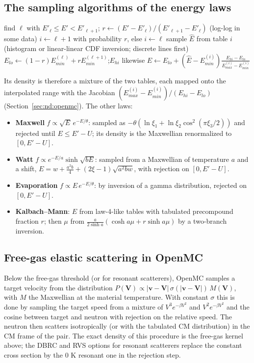 \subsection{The sampling algorithms of the energy laws}

\begin{algorithm}[h]
\caption{Continuous tabular energy law (ENDF law 4 / ACE law 4), as in OpenMC}\label{alg:law4}
\DontPrintSemicolon
find $\ell$ with $E'_\ell\le E'<E'_{\ell+1}$; $r\gets(E'-E'_\ell)/(E'_{\ell+1}-E'_\ell)$ (log-log in some data)\;
$i\gets\ell+1$ with probability $r$, else $i\gets\ell$ 
sample $\hat E$ from table $i$ (histogram or linear-linear CDF inversion; discrete lines first)\;
$E_{lo}\gets(1-r)E^{(\ell)}_{min}+rE^{(\ell+1)}_{min}$;\quad $E_{hi}$ likewise\;
$E\gets E_{lo}+(\hat E-E^{(i)}_{min})\frac{E_{hi}-E_{lo}}{E^{(i)}_{max}-E^{(i)}_{min}}$
\end{algorithm}

Its density is therefore a mixture of the two tables, each mapped onto the interpolated range with the
Jacobian $(E^{(i)}_{max}-E^{(i)}_{min})/(E_{hi}-E_{lo})$ (Section~\ref{sec:nd:openmc}). The other laws:
\begin{itemize}
\item \textbf{Maxwell} $f\propto\sqrt E\,e^{-E/\theta}$: sampled as $-\theta(\ln\xi_1+\ln\xi_2\cos^2(\pi\xi_3/2))$
  and rejected until $E\le E'-U$; its density is the Maxwellian renormalized to $[0,E'-U]$.
\item \textbf{Watt} $f\propto e^{-E/a}\sinh\sqrt{bE}$: sampled from a Maxwellian of temperature $a$ and a
  shift, $E=w+\frac{a^2b}{4}+(2\xi-1)\sqrt{a^2bw}$, with rejection on $[0,E'-U]$.
\item \textbf{Evaporation} $f\propto E\,e^{-E/\theta}$: by inversion of a gamma distribution, rejected on
  $[0,E'-U]$.
\item \textbf{Kalbach--Mann}: $E$ from law-4-like tables with tabulated precompound fraction $r$; then
  $\mu$ from $\frac{a}{2\sinh a}(\cosh a\mu+r\sinh a\mu)$ by a two-branch inversion.
\end{itemize}

\subsection{Free-gas elastic scattering in OpenMC}

Below the free-gas threshold (or for resonant scatterers), OpenMC samples a target velocity from the
distribution $P(\mathbf V)\propto|\mathbf v-\mathbf V|\,\sigma(|\mathbf v-\mathbf V|)\,M(\mathbf V)$, with
$M$ the Maxwellian at the material temperature. With constant $\sigma$ this is done by sampling the
target speed from a mixture of $V^3e^{-\beta V^2}$ and $V^2e^{-\beta V^2}$ and the cosine between target and
neutron with rejection on the relative speed. The neutron then scatters isotropically (or with the
tabulated CM distribution) in the CM frame of the pair. The exact density of this procedure is the
free-gas kernel above; the DBRC and RVS options for resonant scatterers replace the constant cross
section by the 0 K resonant one in the rejection step.

